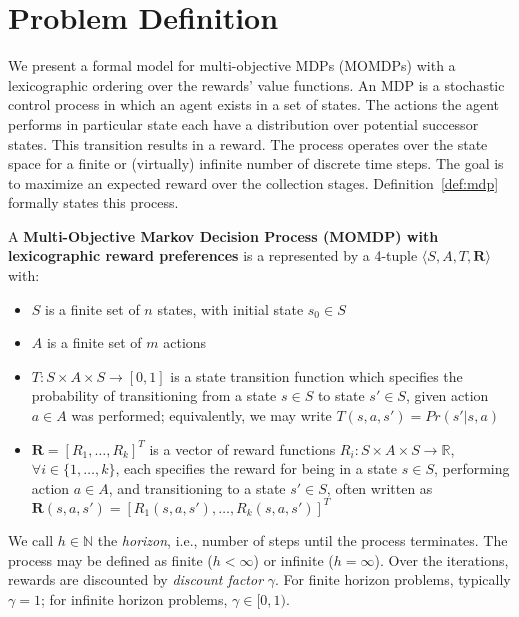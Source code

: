 \section{Problem Definition}
\label{sec:problem_definition}

We present a formal model for multi-objective MDPs (MOMDPs) with a lexicographic ordering over the rewards' value functions. An MDP is a stochastic control process in which an agent exists in a set of states. The actions the agent performs in particular state each have a distribution over potential successor states. This transition results in a reward. The process operates over the state space for a finite or (virtually) infinite number of discrete time steps. The goal is to maximize an expected reward over the collection stages. Definition~\ref{def:mdp} formally states this process.
\begin{definition}
    \label{def:mdp}
    A \textbf{Multi-Objective Markov Decision Process (MOMDP) with lexicographic reward preferences} is a represented by a 4-tuple $\langle S, A, T, \mathbf{R} \rangle$ with:
    \begin{itemize}
        \item $S$ is a finite set of $n$ states, with initial state $s_0 \in S$
        \item $A$ is a finite set of $m$ actions
        \item $T : S \times A \times S \rightarrow [0, 1]$ is a state transition function which specifies the probability of transitioning from a state $s \in S$ to state $s' \in S$, given action $a \in A$ was performed; equivalently, we may write $T(s, a, s') = Pr(s' | s, a)$
        \item $\mathbf{R} = [R_1, \ldots, R_k ]^T$ is a vector of reward functions $R_i : S \times A \times S \rightarrow \mathbb{R}$, $\forall i \in \{1, \ldots, k\}$, each specifies the reward for being in a state $s \in S$, performing action $a \in A$, and transitioning to a state $s' \in S$, often written as $\mathbf{R}(s, a, s') = [R_1(s, a, s'), \ldots, R_k(s, a, s')]^T$
    \end{itemize}
\end{definition}

We call $h \in \mathbb{N}$ the \emph{horizon}, i.e., number of steps until the process terminates. The process may be defined as finite ($h < \infty$) or infinite ($h = \infty$). Over the iterations, rewards are discounted by \emph{discount factor} $\gamma$. For finite horizon problems, typically $\gamma = 1$; for infinite horizon problems, $\gamma \in [0, 1)$.

